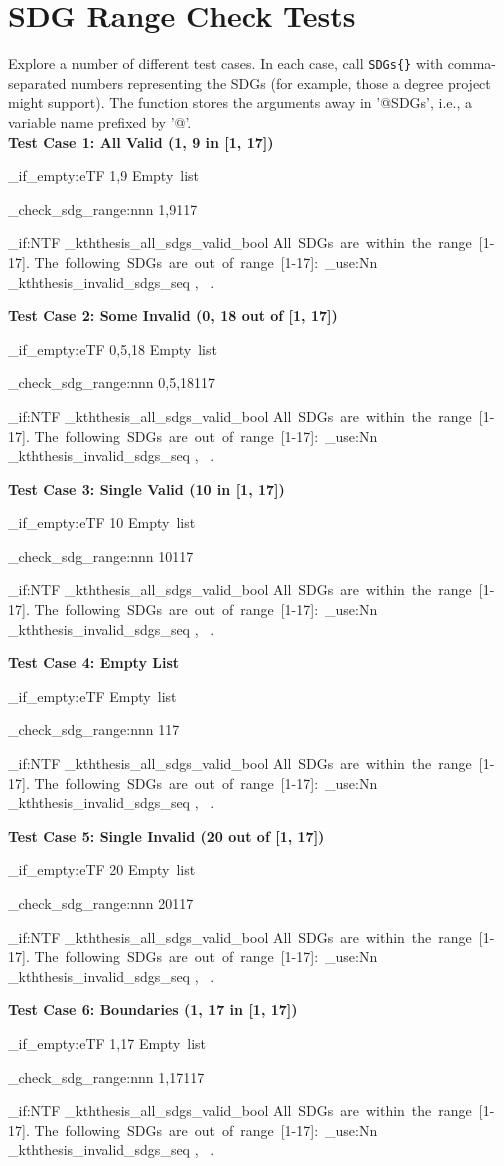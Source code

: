 \documentclass{article}
\makeatletter
\let\@SDGs\@empty
\newcommand{\SDGs}[1]{\def\@SDGs{#1}}
\newcommand{\checkSDGRange}[3]{
    \ExplSyntaxOn %
    \tl_if_empty:eTF {#1} {
    Empty~list
    }
    {
        \kththesis_check_sdg_range:nnn {#1}{#2}{#3}
    
        \bool_if:NTF \g_kththesis_all_sdgs_valid_bool
        { %
            All~SDGs~are~within~the~range~[#2-#3].
        }
        { %
            The~following~SDGs~are~out~of~range~[#2-#3]:~\seq_use:Nn \g_kththesis_invalid_sdgs_seq {,~} .
        }
    }
    \ExplSyntaxOff %
}
\makeatother
\begin{document}
\section*{SDG Range Check Tests}
Explore a number of different test cases. In each case, call \texttt{SDGs\{\}} with comma-separated numbers representing the SDGs (for example, those a degree project might support). The function stores the arguments away in '@SDGs', i.e., a variable name prefixed by '@'.\\

\SDGs{1,9}
\textbf{Test Case 1: All Valid (1, 9 in [1, 17])} \par
\makeatletter
\checkSDGRange{\@SDGs}{1}{17}
\makeatother
\par \vspace{1em}

\SDGs{0,5,18}
\textbf{Test Case 2: Some Invalid (0, 18 out of [1, 17])} \par
\makeatletter
\checkSDGRange{\@SDGs}{1}{17}
\makeatother
\par \vspace{1em}

\SDGs{10}
\textbf{Test Case 3: Single Valid (10 in [1, 17])} \par
\makeatletter
\checkSDGRange{\@SDGs}{1}{17}
\makeatother
\par \vspace{1em}

\SDGs{}
\textbf{Test Case 4: Empty List} \par
\makeatletter
\checkSDGRange{\@SDGs}{1}{17}
\makeatother
\par \vspace{1em}

\SDGs{20}
\textbf{Test Case 5: Single Invalid (20 out of [1, 17])} \par
\makeatletter
\checkSDGRange{\@SDGs}{1}{17}
\makeatother
\par \vspace{1em}

\SDGs{1,17}
\textbf{Test Case 6: Boundaries (1, 17 in [1, 17])} \par
\makeatletter
\checkSDGRange{\@SDGs}{1}{17}
\makeatother
\end{document}
